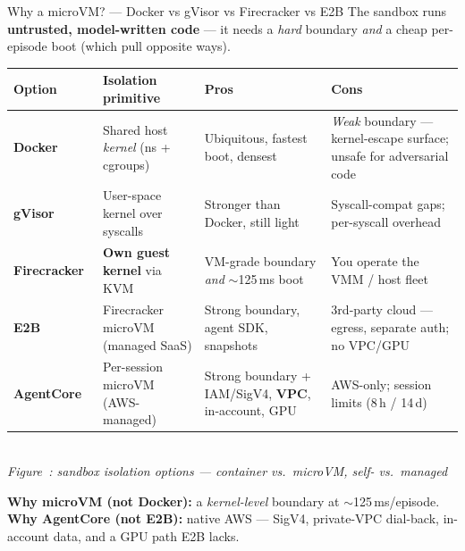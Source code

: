 \documentclass[aspectratio=169]{beamer}
\newcounter{deckfig}
\newcommand{\figtag}[1]{\refstepcounter{deckfig}%
  {\scriptsize\itshape Figure~\thedeckfig: #1}}
\begin{document}
\begin{frame}{Why a microVM? --- Docker vs gVisor vs Firecracker vs E2B}
  \footnotesize The sandbox runs \textbf{untrusted, model-written code} --- it needs a \emph{hard}
  boundary \emph{and} a cheap per-episode boot (which pull opposite ways).
  \begin{center}
  \renewcommand{\arraystretch}{0.9}\scriptsize
  \begin{tabular}{@{}p{2.0cm}p{2.75cm}p{3.05cm}p{3.3cm}@{}}
    \toprule
    \textbf{Option} & \textbf{Isolation primitive} & \textbf{Pros} & \textbf{Cons} \\
    \midrule
    \textbf{Docker} & Shared host \emph{kernel} (ns + cgroups) & Ubiquitous, fastest boot, densest & \emph{Weak} boundary --- kernel-escape surface; unsafe for adversarial code \\
    \textbf{gVisor}~\cite{gvisor} & User-space kernel over syscalls & Stronger than Docker, still light & Syscall-compat gaps; per-syscall overhead \\
    \textbf{Firecracker}~\cite{firecracker} & \textbf{Own guest kernel} via KVM & VM-grade boundary \emph{and} $\sim$125\,ms boot & You operate the VMM / host fleet \\
    \textbf{E2B}~\cite{e2b} & Firecracker microVM (managed SaaS) & Strong boundary, agent SDK, snapshots & 3rd-party cloud --- egress, separate auth; no VPC/GPU \\
    \textbf{AgentCore}~\cite{ac-docs} & Per-session microVM (AWS-managed) & Strong boundary + IAM/SigV4, \textbf{VPC}, in-account, GPU & AWS-only; session limits (8\,h / 14\,d) \\
    \bottomrule
  \end{tabular}
  \\[0.2em]\figtag{sandbox isolation options --- container vs.\ microVM, self- vs.\ managed}
  \end{center}
  \vspace{-0.1em}
  {\footnotesize\sloppy \textbf{Why microVM (not Docker):} a \emph{kernel-level} boundary at
  $\sim$125\,ms/episode. \textbf{Why AgentCore (not E2B):} native AWS --- SigV4, private-VPC dial-back,
  in-account data, and a GPU path E2B lacks.\par}
\end{frame}
\end{document}
